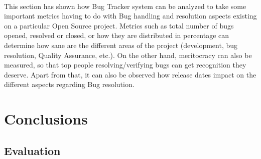 \documentclass[a4paper, 12pt]{book}
\begin{document}
{\\
This section has shown how Bug Tracker system can be analyzed to take some important metrics having to do with Bug handling and resolution aspects existing on a particular Open Source project}. Metrics such as total number of bugs opened, resolved or closed, or how they are distributed in percentage can determine how sane are the different areas of the project (development, bug resolution, Quality Assurance, etc.). On the other hand, meritocracy can also be measured, so that top people resolving/verifying bugs can get recognition they deserve. Apart from that, it can also be observed how release dates impact on the different aspects regarding Bug resolution.


\chapter{Conclusions}
\label{chap:conclusions}


\section{Evaluation}
\label{sec:evaluation}
\end{document}
